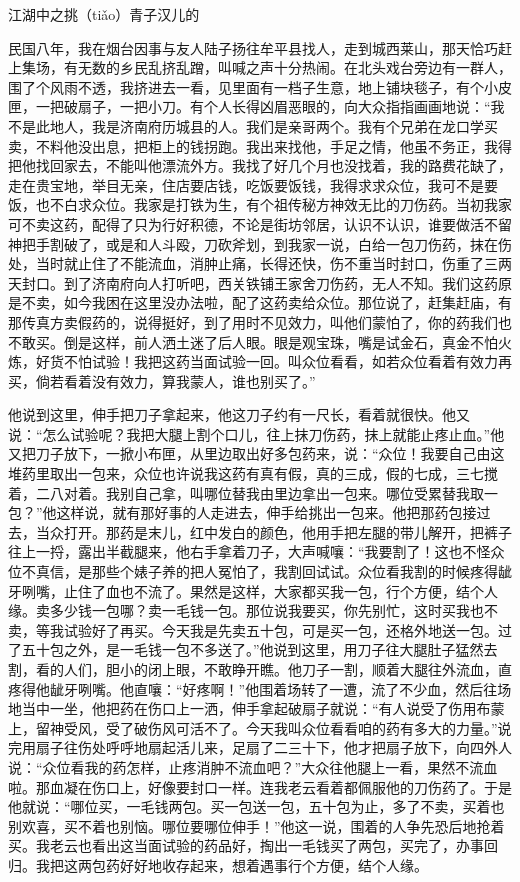 \documentclass[12pt,UTF8]{ctexbook}
\begin{document}
江湖中之挑（tiǎo）青子汉儿的


民国八年，我在烟台因事与友人陆子扬往牟平县找人，走到城西莱山，那天恰巧赶上集场，有无数的乡民乱挤乱蹭，叫喊之声十分热闹。在北头戏台旁边有一群人，围了个风雨不透，我挤进去一看，见里面有一档子生意，地上铺块毯子，有个小皮匣，一把破扇子，一把小刀。有个人长得凶眉恶眼的，向大众指指画画地说：“我不是此地人，我是济南府历城县的人。我们是亲哥两个。我有个兄弟在龙口学买卖，不料他没出息，把柜上的钱拐跑。我出来找他，手足之情，他虽不务正，我得把他找回家去，不能叫他漂流外方。我找了好几个月也没找着，我的路费花缺了，走在贵宝地，举目无亲，住店要店钱，吃饭要饭钱，我得求求众位，我可不是要饭，也不白求众位。我家是打铁为生，有个祖传秘方神效无比的刀伤药。当初我家可不卖这药，配得了只为行好积德，不论是街坊邻居，认识不认识，谁要做活不留神把手割破了，或是和人斗殴，刀砍斧划，到我家一说，白给一包刀伤药，抹在伤处，当时就止住了不能流血，消肿止痛，长得还快，伤不重当时封口，伤重了三两天封口。到了济南府向人打听吧，西关铁铺王家舍刀伤药，无人不知。我们这药原是不卖，如今我困在这里没办法啦，配了这药卖给众位。那位说了，赶集赶庙，有那传真方卖假药的，说得挺好，到了用时不见效力，叫他们蒙怕了，你的药我们也不敢买。倒是这样，前人洒土迷了后人眼。眼是观宝珠，嘴是试金石，真金不怕火炼，好货不怕试验！我把这药当面试验一回。叫众位看看，如若众位看着有效力再买，倘若看着没有效力，算我蒙人，谁也别买了。”

他说到这里，伸手把刀子拿起来，他这刀子约有一尺长，看着就很快。他又说：“怎么试验呢？我把大腿上割个口儿，往上抹刀伤药，抹上就能止疼止血。”他又把刀子放下，一掀小布匣，从里边取出好多包药来，说：“众位！我要自己由这堆药里取出一包来，众位也许说我这药有真有假，真的三成，假的七成，三七搅着，二八对着。我别自己拿，叫哪位替我由里边拿出一包来。哪位受累替我取一包？”他这样说，就有那好事的人走进去，伸手给挑出一包来。他把那药包接过去，当众打开。那药是末儿，红中发白的颜色，他用手把左腿的带儿解开，把裤子往上一捋，露出半截腿来，他右手拿着刀子，大声喊嚷：“我要割了！这也不怪众位不真信，是那些个婊子养的把人冤怕了，我割回试试。众位看我割的时候疼得龇牙咧嘴，止住了血也不流了。果然是这样，大家都买我一包，行个方便，结个人缘。卖多少钱一包哪？卖一毛钱一包。那位说我要买，你先别忙，这时买我也不卖，等我试验好了再买。今天我是先卖五十包，可是买一包，还格外地送一包。过了五十包之外，是一毛钱一包不多送了。”他说到这里，用刀子往大腿肚子猛然去割，看的人们，胆小的闭上眼，不敢睁开瞧。他刀子一割，顺着大腿往外流血，直疼得他龇牙咧嘴。他直嚷：“好疼啊！”他围着场转了一遭，流了不少血，然后往场地当中一坐，他把药在伤口上一洒，伸手拿起破扇子就说：“有人说受了伤用布蒙上，留神受风，受了破伤风可活不了。今天我叫众位看看咱的药有多大的力量。”说完用扇子往伤处呼呼地扇起活儿来，足扇了二三十下，他才把扇子放下，向四外人说：“众位看我的药怎样，止疼消肿不流血吧？”大众往他腿上一看，果然不流血啦。那血凝在伤口上，好像要封口一样。连我老云看着都佩服他的刀伤药了。于是他就说：“哪位买，一毛钱两包。买一包送一包，五十包为止，多了不卖，买着也别欢喜，买不着也别恼。哪位要哪位伸手！”他这一说，围着的人争先恐后地抢着买。我老云也看出这当面试验的药品好，掏出一毛钱买了两包，买完了，办事回归。我把这两包药好好地收存起来，想着遇事行个方便，结个人缘。
\end{document}
